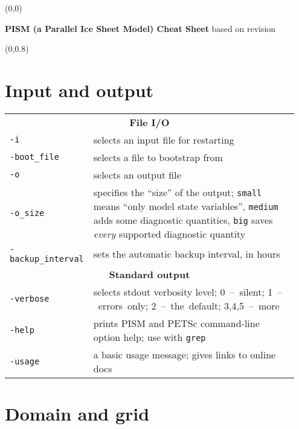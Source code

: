 \documentclass[landscape]{article}
\newcommand{\PISMREV}{revision }
\newcommand{\tabletitle}[1]{\multicolumn{2}{c}{\textbf{#1}}}
\begin{document}
\pagestyle{empty}

\begin{textblock}{47}(0,0)
  \begin{center}
    \Large{\textbf{PISM (a Parallel Ice Sheet Model) Cheat Sheet} based on \PISMREV}
  \end{center}
\end{textblock}

\begin{textblock}{15}(0,0.8)
\section{Input and output}
\label{sec:input-output}

\begin{tabular}{@{}p{0.2\linewidth}p{0.75\linewidth}@{}}
\tabletitle{File I/O} \\
\texttt{-i} & selects an input file for restarting \\
\texttt{-boot_file} & selects a file to bootstrap from \\
\texttt{-o} & selects an output file \\
\texttt{-o_size} & specifies the ``size'' of the output; \texttt{small} means
``only model state variables'', \texttt{medium} adds some
diagnostic quantities, \texttt{big} saves \emph{every} supported diagnostic quantity\\
\texttt{-backup_interval} & sets the automatic backup interval, in hours\\
\tabletitle{Standard output} \\
\texttt{-verbose} & selects stdout verbosity level; \mbox{0 -- silent}; \mbox{1 --
errors only}; \mbox{2 -- the default}; \mbox{3,4,5 -- more}\\
\texttt{-help} & prints PISM and PETSc command-line option help; use with \texttt{grep}\\
\texttt{-usage} & a basic usage message; gives links to online docs\\
\end{tabular}

\section{Domain and grid}
\label{sec:grid-setup}
  

\end{textblock}
\end{document}
